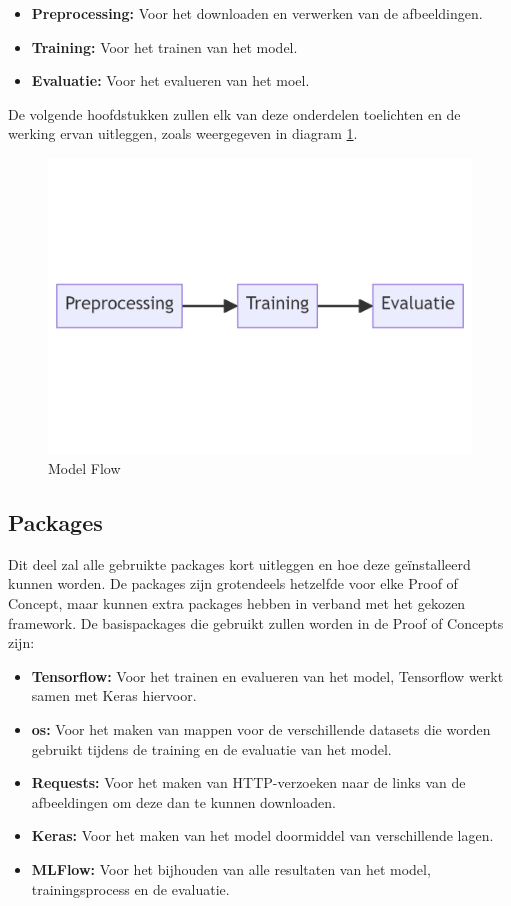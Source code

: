 \begin{itemize}
    \item \textbf{Preprocessing:} Voor het downloaden en verwerken van de afbeeldingen.
    \item \textbf{Training:} Voor het trainen van het model.
    \item \textbf{Evaluatie:} Voor het evalueren van het moel.
\end{itemize}

De volgende hoofdstukken zullen elk van deze onderdelen toelichten en de werking ervan uitleggen, zoals weergegeven in diagram \ref{fig:Model_Flow}.
\begin{figure}[htbp]
    \includegraphics[width=\linewidth]{graphics/Model_Diagram.PNG}
    \caption{Model Flow}
    \label{fig:Model_Flow}
\end{figure}
\subsection{Packages}
Dit deel zal alle gebruikte packages kort uitleggen en hoe deze geïnstalleerd kunnen worden. De packages zijn grotendeels hetzelfde voor elke Proof of Concept, maar kunnen extra packages hebben in verband met het gekozen framework.
De basispackages die gebruikt zullen worden in de Proof of Concepts zijn:
\begin{itemize}
    \item \textbf{Tensorflow:} Voor het trainen en evalueren van het model, Tensorflow werkt samen met Keras hiervoor.
    \item \textbf{os:} Voor het maken van mappen voor de verschillende datasets die worden gebruikt tijdens de training en de evaluatie van het model.
    \item \textbf{Requests:} Voor het maken van HTTP-verzoeken naar de links van de afbeeldingen om deze dan te kunnen downloaden.
    \item \textbf{Keras:} Voor het maken van het model doormiddel van verschillende lagen.
    \item \textbf{MLFlow:} Voor het bijhouden van alle resultaten van het model, trainingsprocess en de evaluatie.
\end{itemize}

